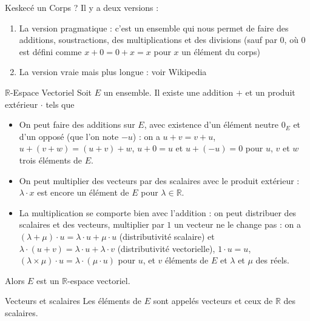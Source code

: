 \documentclass{classe}
\begin{document}
\begin{remarque}{Keskecé un Corps ?}{}
	Il y a deux versions :
	\begin{enumerate}
		\item La version pragmatique : c'est un ensemble qui nous permet de faire des additions, soustractions, des multiplications et des divisions (sauf par $0$, où $0$ est défini comme $x+0 = 0+x = x$ pour $x$ un élément du corps)
		\item La version vraie mais plus longue : voir Wikipedia
	\end{enumerate}
\end{remarque}

\begin{définition}{$\mathbb{R}$-Espace Vectoriel}{}
	Soit $E$ un ensemble. Il existe une addition $+$ et un produit extérieur $\cdot$ tels que
	\begin{itemize}
		\item On peut faire des additions sur $E$, avec existence d'un élément neutre $0_E$ et d'un opposé (que l'on note $-u$) : on a $u+v = v+u$, $u+(v+w) = (u+v)+w$, $u+0=u$ et $u + (-u) = 0$ pour $u$, $v$ et $w$ trois éléments de $E$.
		\item On peut multiplier des vecteurs par des scalaires avec le produit extérieur : $\lambda\cdot x$ est encore un élément de $E$ pour $\lambda \in \mathbb{R}$.
		\item La multiplication se comporte bien avec l'addition : on peut distribuer des scalaires et des vecteurs, multiplier par $1$ un vecteur ne le change pas : on a $(\lambda + \mu)\cdot u = \lambda\cdot u + \mu\cdot u$ (distributivité scalaire) et $\lambda\cdot (u+v) = \lambda \cdot u+\lambda\cdot v$ (distributivité vectorielle), $1\cdot u = u$, $(\lambda\times\mu)\cdot u = \lambda\cdot (\mu\cdot u)$ pour $u$, et $v$ éléments de $E$ et $\lambda$ et $\mu$ des réels.
	\end{itemize}
	Alors $E$ est un $\mathbb{R}$-espace vectoriel.
\end{définition}

\begin{définition}{Vecteurs et scalaires}{}
	Les éléments de $E$ sont appelés vecteurs et ceux de $\mathbb{R}$ des scalaires.
\end{définition}
\end{document}
